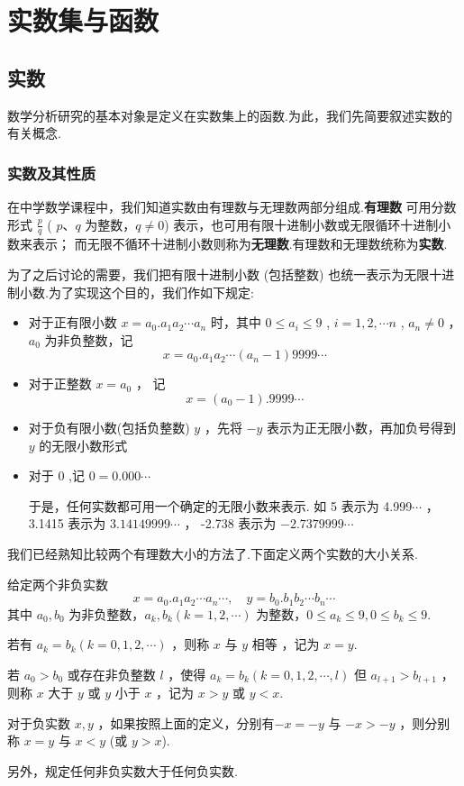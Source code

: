 \chapter{实数集与函数}


\section{实数}

数学分析研究的基本对象是定义在实数集上的函数.为此，我们先简要叙述实数的有关概念.

\subsection{实数及其性质}

在中学数学课程中，我们知道实数由有理数与无理数两部分组成.\textbf{有理数} 可用分数形式 $\frac{p}{q}$ ( $p$、$q$ 为整数，$q \neq 0$) 表示，也可用有限十进制小数或无限循环十进制小数来表示； 而无限不循环十进制小数则称为\textbf{无理数}.有理数和无理数统称为\textbf{实数}.

为了之后讨论的需要，我们把有限十进制小数 (包括整数) 也统一表示为无限十进制小数.为了实现这个目的，我们作如下规定:
\begin{itemize}
    \item 对于正有限小数 $x=a_0.a_1 a_2 \cdots a_n$ 时，其中 $0 \leq a_i \leq 9$ , $i=1,2,\cdots n$ , $a_n \ne 0$ ，$a_0$ 为非负整数，记
    \[
        x = a_0.a_1 a_2 \cdots (a_n-1) 9999\cdots
    \]
    \item 对于正整数 $x=a_0$ ， 记
    \[
        x = (a_0-1).9999\cdots
    \]
    \item 对于负有限小数(包括负整数) $y$ ，先将 $-y$ 表示为正无限小数，再加负号得到 $y$ 的无限小数形式
    \item 对于 0 ,记 $0=0.000 \cdots$

    于是，任何实数都可用一个确定的无限小数来表示. 如 5 表示为 4.999$\cdots$ ， 3.1415 表示为 $3.14149999 \cdots$ ， -2.738 表示为 $-2.7379999 \cdots$
\end{itemize}

我们已经熟知比较两个有理数大小的方法了.下面定义两个实数的大小关系.

\begin{definition}
[非负实数的大小]
 给定两个非负实数
\[
  x=a_0.a_1 a_2 \cdots a_n \cdots, \quad y=b_0.b_1 b_2 \cdots b_n \cdots
\]
其中 $a_0,b_0$ 为非负整数，$a_k,b_k(k=1,2,\cdots)$ 为整数，$0\le a_k \le 9,0\le b_k \le 9$.

\textbullet 若有 $a_k = b_k(k=0,1,2,\cdots)$ ，则称 $x$ 与 $y$ 相等 ，记为 $x=y$.
    
\textbullet 若 $a_0>b_0$ 或存在非负整数 $l$ ，使得 $a_k = b_k(k=0,1,2,\cdots,l)$ 但 $a_{l+1}>b_{l+1}$ ，则称 $x$ 大于 $y$ 或 $y$ 小于 $x$ ，记为 $x>y$ 或 $y<x$.

\qquad 对于负实数 $x,y$ ，如果按照上面的定义，分别有$-x=-y$ 与 $-x>-y$ ，则分别称 $x=y$ 与 $x<y$ (或 $y>x$).

\qquad 另外，规定任何非负实数大于任何负实数.    
\end{definition}

